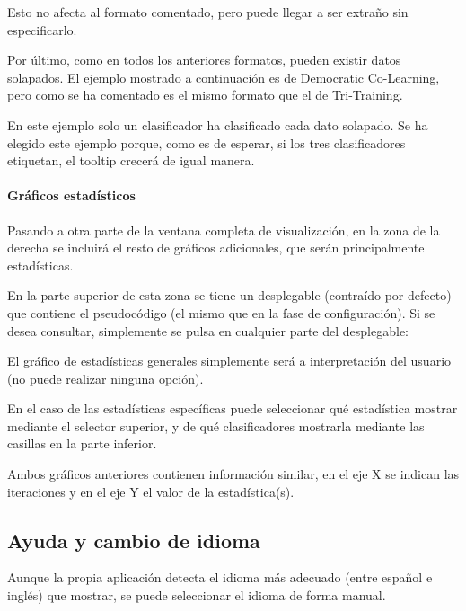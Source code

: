 Esto no afecta al formato comentado, pero puede llegar a ser extraño sin
especificarlo.

Por último, como en todos los anteriores formatos, pueden existir datos
solapados. El ejemplo mostrado a continuación es de Democratic Co-Learning, pero
como se ha comentado es el mismo formato que el de Tri-Training.


En este ejemplo solo un clasificador ha clasificado cada dato solapado. Se ha
elegido este ejemplo porque, como es de esperar, si los tres clasificadores
etiquetan, el tooltip crecerá de igual manera.

\paragraph{Gráficos estadísticos} Pasando a otra parte de la ventana completa de
visualización, en la zona de la derecha se incluirá el resto de gráficos
adicionales, que serán principalmente estadísticas.


En la parte superior de esta zona se tiene un desplegable (contraído por
defecto) que contiene el pseudocódigo (el mismo que en la fase de
configuración). Si se desea consultar, simplemente se pulsa en cualquier parte
del desplegable:


El gráfico de estadísticas generales simplemente será a interpretación del
usuario (no puede realizar ninguna opción). 

En el caso de las estadísticas específicas puede seleccionar qué estadística
mostrar mediante el selector superior, y de qué clasificadores mostrarla
mediante las casillas en la parte inferior.

Ambos gráficos anteriores contienen información similar, en el eje X se indican
las iteraciones y en el eje Y el valor de la estadística(s).

\subsection{Ayuda y cambio de idioma}



Aunque la propia aplicación detecta el idioma más adecuado (entre español e
inglés) que mostrar, se puede seleccionar el idioma de forma manual.

